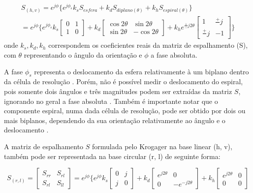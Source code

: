 \documentclass{article}
\begin{document}
\begin{multline}
    S_{(h, v)} = e^{j\phi} \{e^{j\phi_s}k_sS_{esfera}+k_dS_{diplano(\theta)}+k_hS_{espiral(\theta)}\} \\
    =e^{j\phi} \Big\{ e^{j\phi_s}k_s \begin{bmatrix}
    	0 & 1 \\
    	1 & 0
	\end{bmatrix}+k_d \begin{bmatrix}
    	\cos{2\theta} & \sin{2\theta} \\
    	\sin{2\theta} & -\cos{2\theta}
	\end{bmatrix}+k_he^{\frac{+}{-}j2\theta} \begin{bmatrix}
    	1 & \frac{+}{}j \\
    	\frac{+}{}j & -1
	\end{bmatrix} \Big\}
\end{multline}
onde $k_{s}, k_{d}, k_{h}$ correspondem os coeficientes reais da matriz de espalhamento (S), com $\theta$ representando o ângulo da orientação e $\phi$ a fase absoluta.

A fase $\phi_{s}$ representa o deslocamento da esfera relativamente à um biplano dentro da célula de resolução \cite{jong:2009}. Porém, não é possível medir o deslocamento do espiral, pois somente dois ângulos e três magnitudes podem ser extraídas da matriz $S$, ignorando no geral a fase absoluta \cite{jong:2009}. Também é importante notar que o componente espiral, numa dada célula de resolução, pode ser obtido por dois ou mais biplanos, dependendo da sua orientação relativamente ao ângulo e o deslocamento \cite{jong:2009}.

A matriz de espalhamento $S$ formulada pelo Krogager na base linear (h, v), também pode ser representada na base circular (r, l) de seguinte forma:

\begin{equation}
        S_{(r, l)}= \begin{bmatrix}
    	S_{rr} & S_{rl}\\
    	S_{rl} & S_{ll}
	\end{bmatrix}
    =e^{j\phi}\{e^{j\phi}k_s\begin{bmatrix}
    	0 & j\\
    	j & 0
	\end{bmatrix}+k_d\begin{bmatrix}
    	e^{j2\theta} & 0\\
    	0 & -e^{-j2\theta}
	\end{bmatrix}+k_h\begin{bmatrix}
    	e^{j2\theta} & 0\\
    	0 & 0
	\end{bmatrix}
\end{equation}
\end{document}
